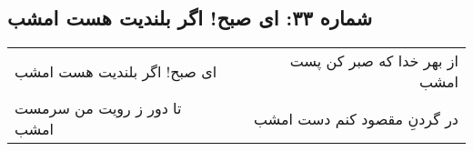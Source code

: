 \begin{center}
\section*{شماره ۳۳: ای صبح! اگر بلندیت هست امشب}
\label{sec:033}
\begin{longtable}{l p{0.5cm} r}
ای صبح! اگر بلندیت هست امشب
&&
از بهر خدا که صبر کن پست امشب
\\
تا دور ز رویت من سرمست امشب
&&
در گردنِ مقصود کنم دست امشب
\\
\end{longtable}
\end{center}
